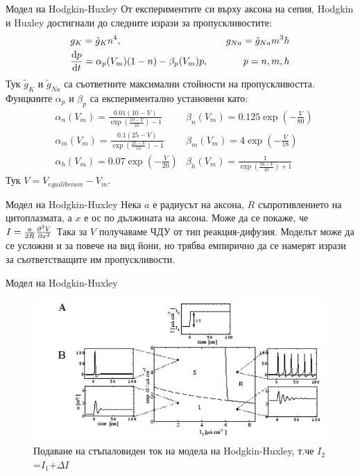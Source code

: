 \begin{frame}[t]{Модел на Hodgkin-Huxley}
  От експериментите си върху аксона на сепия, Hodgkin и Huxley достигнали до следните изрази за пропускливостите:
  \begin{align*}
    &g_{K}=\tilde{g}_{K}n^4,\quad &g_{Na}=\tilde{g}_{Na}m^3h \\
    &\dv{p}{t}=\alpha_p(V_m)(1-n)-\beta_p(V_m)p,\quad &p={n,m,h}
  \end{align*}
  Тук $\tilde{g}_{K}$ и $\tilde{g}_{Na}$ са съответните максимални стойности на пропускливостта.
  Фунцкиите $\alpha_p$ и $\beta_p$ са експериментално установени като: 
  \begin{align*}
    &\alpha_{n}(V_{m})={\frac{0.01(10-V)}{\exp\left({\frac{10-V}{10}}\right)-1}} &\beta_{n}(V_{m})=0.125\exp\left(-\frac{V}{80}\right)\\
    &\alpha_{m}(V_{m})={\frac{0.1(25-V)}{\exp\left({\frac{25-V}{10}}\right)-1}} &\beta_{m}(V_{m})=4\exp\left(-\frac{V}{18}\right)\\
    &\alpha_{h}(V_{m})=0.07\exp\left(-{\frac{V}{20}}\right) &\beta_{h}(V_{m})={\frac{1}{\exp\left({\frac{30-V}{10}}\right)+1}}  
  \end{align*}
  Тук $V = V_{equilibrium} - V_m$.
\end{frame}

\begin{frame}[t]{Модел на Hodgkin-Huxley}
  Нека $a$ е радиусът на аксона, $R$ съпротивлението на цитоплазмата, а $x$ е ос по дължината на аксона.
  Може да се покаже, че $I={\frac{a}{2R}}\pdv[2]{V}{x}$
  Така за $V$ получаваме ЧДУ от тип реакция-дифузия.
  Моделът може да се усложни и за повече на вид йони, но трябва емпирично да се намерят изрази за съответстващите им пропускливости.
\end{frame}

\begin{frame}[t]{Модел на Hodgkin-Huxley}
  \begin{figure}[htbp!]
      \centering
      \includegraphics[width=\textwidth,height=0.7\textheight,keepaspectratio]{hodgkin-huxley-response.PNG}
      \caption{Подаване на стъпаловиден ток на модела на Hodgkin-Huxley, т.че $I_2$=$I_1$+$\Delta I$ \cite[Фиг 2.6]{Spiking}}
  \end{figure}
\end{frame}

